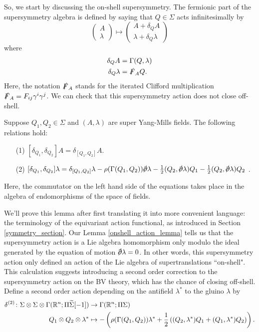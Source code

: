 \documentclass[10pt, oneside]{article}
\begin{document}
So, we start by discussing the on-shell supersymmetry.  The fermionic part of the supersymmetry algebra is defined by saying that $Q \in \Sigma$ acts infinitesimally by
\[
\begin{pmatrix}
A \\ \lambda
\end{pmatrix}
\mapsto
\begin{pmatrix} A + \delta_Q A \\
\lambda + \delta_Q \lambda
\end{pmatrix}
\]
where 
\begin{align*}
\delta_Q A &= \Gamma(Q,\lambda) \\
\delta_Q \lambda &= \slashed{F}_A Q .
\end{align*}
Here, the notation $\slashed{F}_A$ stands for the iterated Clifford multiplication $\slashed{F}_A = F_{ij} \gamma^i \gamma^j$.  We can check that this supersymmetry action does not close off-shell.  

\begin{lemma} \label{onshell_action_lemma}
Suppose $Q_1, Q_2 \in \Sigma$ and $(A, \lambda)$ are super Yang-Mills fields.
The following relations hold:
\begin{itemize}
\item[(1)] \label{10dsusyA} $ [\delta_{Q_1}, \delta_{Q_2}] A = \delta_{[Q_1, Q_2]} A$.
\item[(2)] \label{10dsusyL} $ [\delta_{Q_1}, \delta_{Q_2}] \lambda = \delta_{[Q_1,Q_2]} \lambda - \rho(\Gamma(Q_1,Q_2)) \sd \dd \lambda - \frac 12(Q_2, \sd \dd \lambda)Q_1 - \frac 12(Q_2, \sd \dd \lambda)Q_2$ .
\end{itemize}
Here, the commutator on the left hand side of the equations takes place in the algebra of endomorphisms of the space of fields.
\end{lemma}

We'll prove this lemma after first translating it into more convenient language: the terminology of the equivariant action functional, as introduced in Section \ref{symmetry_section}.  Our Lemma \ref{onshell_action_lemma} tells us that the supersymmetry action is a Lie algebra homomorphism only modulo the ideal generated by the equation of motion $\sd \dd \lambda = 0$.
In other words, this supersymmetry action only defined an action of the Lie algebra of supertranslations ``on-shell".  This calculation suggests introducing a second order correction to the supersymmetry action on the BV theory, which has the chance of closing off-shell.  Define a second order action depending on the antifield $\lambda^*$ to the gluino $\lambda$ by
\begin{align*}
\delta^{(2)} \colon \Sigma \otimes \Sigma \otimes \Gamma(\mathbb R^{n}; \Pi \widetilde{\Sigma}[-1]) &\to \Gamma(\mathbb R^{n}; \Pi \Sigma) \\
Q_1 \otimes Q_2 \otimes \lambda^* &\mapsto - \left(\rho(\Gamma(Q_1,Q_2)) \lambda^* + \frac 12 \left((Q_2, \lambda^*)Q_1 + (Q_1, \lambda^*)Q_2\right)\right).
\end{align*}
\end{document}
